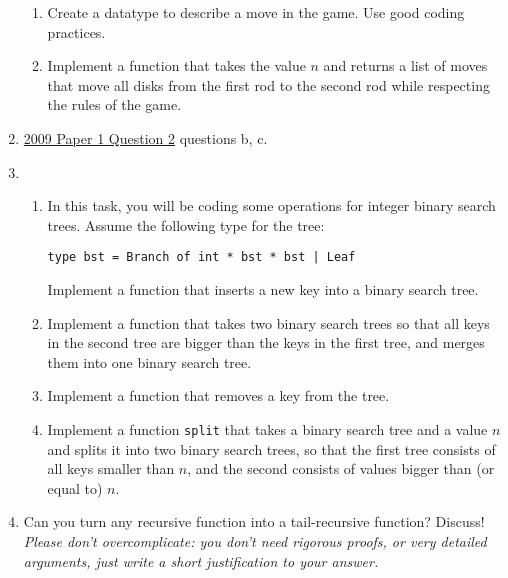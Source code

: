 \documentclass[11pt,a4paper]{article}
\begin{document}
\begin{enumerate}
\begin{enumerate}
    \item Create a datatype to describe a move in the game. Use good coding practices.

    \item Implement a function that takes the value $n$ and returns a list of moves that move all disks from the first rod to 
    the second rod while respecting the rules of the game. 
\end{enumerate}

\item
\href{https://www.cl.cam.ac.uk/teaching/exams/pastpapers/y2009p1q2.pdf}{2009 Paper 1 Question 2} questions b, c.

\item
\begin{enumerate}
    \item In this task, you will be coding some operations for integer binary search trees.  
    Assume the following type for the tree:  
    \begin{verbatim}
type bst = Branch of int * bst * bst | Leaf
    \end{verbatim}
    Implement a function that inserts a new key into a binary search tree.

    \item Implement a function that takes two binary search trees so that all keys in the second tree are bigger than the keys in the first tree, and merges them 
    into one binary search tree.

    \item Implement a function that removes a key from the tree.

    \item Implement a function \verb|split| that takes a binary search tree and a value $n$ 
    and splits it into two binary search trees, so that the first tree consists of all keys smaller than $n$, 
    and the second consists of values bigger than (or equal to) $n$.
\end{enumerate}
\item Can you turn any recursive function into a tail-recursive function? Discuss!\\\emph{Please don't overcomplicate: you don't need rigorous proofs, or very detailed arguments, just write a short justification to your answer.}
\end{enumerate}
\end{document}
